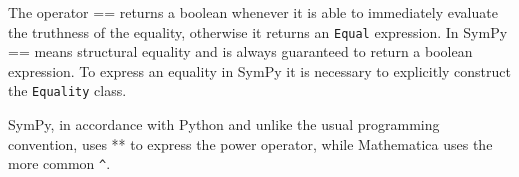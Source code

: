 The operator == returns a boolean whenever it is able to immediately evaluate
the truthness of the equality, otherwise it returns an \texttt{Equal} expression.
In SymPy == means structural equality and is always guaranteed to return a
boolean expression.
To express an equality in SymPy it is necessary to explicitly construct the
\texttt{Equality} class.


SymPy, in accordance with Python and unlike the usual programming convention,
uses ** to express the power operator, while Mathematica uses the more
common \verb|^|.

